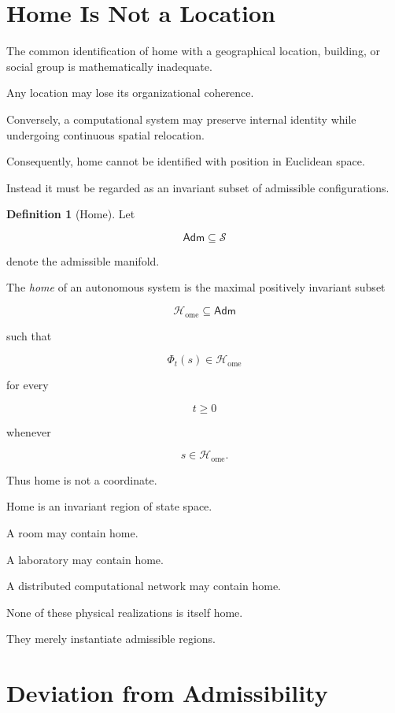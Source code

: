 \documentclass[11pt,oneside]{book}
\numberwithin{equation}{chapter}
\theoremstyle{definition}
\newtheorem{definition}{Definition}[chapter]
\theoremstyle{plain}
\begin{document}
\section{Home Is Not a Location}

The common identification of home with a geographical location, building, or
social group is mathematically inadequate.

Any location may lose its organizational coherence.

Conversely, a computational system may preserve internal identity while
undergoing continuous spatial relocation.

Consequently, home cannot be identified with position in Euclidean space.

Instead it must be regarded as an invariant subset of admissible
configurations.

\begin{definition}[Home]

Let

\[
\mathsf{Adm}\subseteq\mathcal{S}
\]

denote the admissible manifold.

The \emph{home} of an autonomous system is the maximal positively invariant
subset

\[
\mathcal{H}_{\mathrm{ome}}
\subseteq
\mathsf{Adm}
\]

such that

\[
\Phi_t(s)
\in
\mathcal{H}_{\mathrm{ome}}
\]

for every

\[
t\ge0
\]

whenever

\[
s\in
\mathcal{H}_{\mathrm{ome}}.
\]

\end{definition}

Thus home is not a coordinate.

Home is an invariant region of state space.

A room may contain home.

A laboratory may contain home.

A distributed computational network may contain home.

None of these physical realizations is itself home.

They merely instantiate admissible regions.

\section{Deviation from Admissibility}
\end{document}
